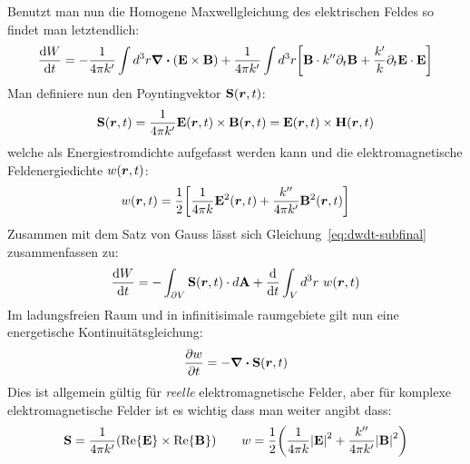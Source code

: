 Benutzt man nun die Homogene Maxwellgleichung des elektrischen Feldes so findet man letztendlich:
\begin{equation}\label{eq:dwdt-subfinal}
  \dv{W}{t} 
  = -\frac{1}{4\pi k'} \int d^3r \div\qty(\vb E\times\vb B)
  +\frac{1}{4\pi k'} \int d^3r \qty[
  \vb B\cdot k''\partial_t \vb B + \frac{k'}{k}\partial_t \vb E\cdot\vb E]
\end{equation}
Man definiere nun den Poyntingvektor $\vb S(\vb*r, t)$:
\begin{equation}
  \vb S(\vb*r, t) = \frac{1}{4\pi k'} \vb E(\vb*r, t) \times \vb B(\vb*r, t) = \vb E(\vb*r, t) \times \vb H(\vb*r, t)
\end{equation}
welche als Energiestromdichte aufgefasst werden kann
und die elektromagnetische Feldenergiedichte $w(\vb*r, t)$:
\begin{equation}
  w(\vb*r, t)=\frac{1}{2} \qty[\frac{1}{4\pi k}\vb E^2(\vb*r, t) + \frac{k''}{4\pi k'}\vb B^2(\vb*r, t)]
\end{equation}
Zusammen mit dem Satz von Gauss lässt sich Gleichung~\ref{eq:dwdt-subfinal} zusammenfassen zu:
\begin{equation}
  \dv{W}{t} =
  - \int_{\partial V} \vb S(\vb*r, t)\cdot d\vb A + \dv t \int_V d^3 r\ w(\vb*r, t)
\end{equation}
Im ladungsfreien Raum und in infinitisimale raumgebiete gilt nun eine energetische Kontinuitätsgleichung:
\begin{equation}
  \pdv{w}{t}(\vb*r, t) = - \div \vb S(\vb*r, t)
\end{equation}
Dies ist allgemein gültig für \textit{reelle} elektromagnetische Felder, aber für komplexe elektromagnetische Felder ist es wichtig dass man weiter angibt dass:
\begin{equation}
  \vb S= \frac{1}{4\pi k'}\qty(\mathrm{Re}\qty{\vb E}\times \mathrm{Re}\qty{\vb B})
  \qquad
  w = \frac{1}{2} \qty( \frac{1}{4\pi k} \abs{\vb E}^2 +  \frac{k''}{4\pi k'}\abs{\vb B}^2 )
\end{equation}
